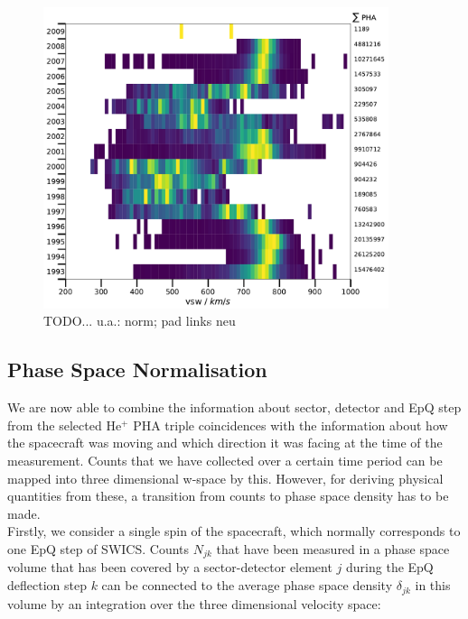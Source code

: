 \begin{figure}[h]
	\includegraphics[width=0.9\textwidth]{Figures/vsw_all_years_brw.pdf}
	\centering
	\caption{TODO... u.a.: norm; pad links neu}
	\label{fig:vsw_years}
\end{figure}


%
\subsection{Phase Space Normalisation}
We are now able to combine the information about sector, detector and EpQ step from the selected $\mathrm{He^{+}}$ PHA triple coincidences with the information about how the spacecraft was moving and which direction it was facing at the time of the measurement.
Counts that we have collected over a certain time period can be mapped into three dimensional w-space by this. However, for deriving physical quantities from these, a transition from counts to phase space density has to be made.\\
Firstly, we consider a single spin of the spacecraft, which normally corresponds to one EpQ step of SWICS.
Counts $N_{jk}$ that have been measured in a phase space volume that has been covered by a sector-detector element $j$ during the EpQ deflection step $k$ can be connected to the average phase space density $\delta_{jk}$ in this volume by an integration over the three dimensional velocity space:


